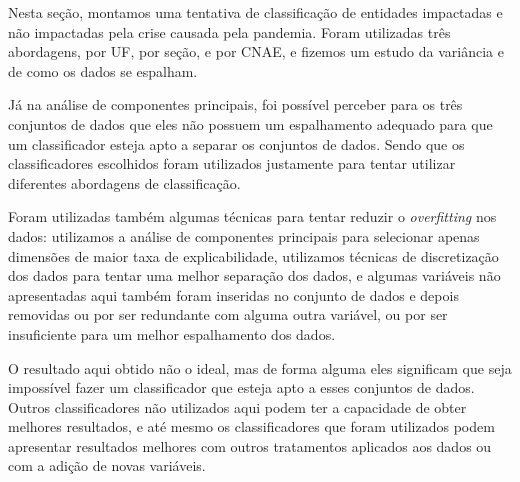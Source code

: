 Nesta seção, montamos uma tentativa de classificação de entidades impactadas e não impactadas pela crise causada pela pandemia. Foram utilizadas três abordagens, por UF, por seção, e por CNAE, e fizemos um estudo da variância e de como os dados se espalham.

Já na análise de componentes principais, foi possível perceber para os três conjuntos de dados que eles não possuem um espalhamento adequado para que um classificador esteja apto a separar os conjuntos de dados. Sendo que os classificadores escolhidos foram utilizados justamente para tentar utilizar diferentes abordagens de classificação.

Foram utilizadas também algumas técnicas para tentar reduzir o \textit{overfitting} nos dados: utilizamos a análise de componentes principais para selecionar apenas dimensões de maior taxa de explicabilidade, utilizamos técnicas de discretização dos dados para tentar uma melhor separação dos dados, e algumas variáveis não apresentadas aqui também foram inseridas no conjunto de dados e depois removidas ou por ser redundante com alguma outra variável, ou por ser insuficiente para um melhor espalhamento dos dados.

O resultado aqui obtido não o ideal, mas de forma alguma eles significam que seja impossível fazer um classificador que esteja apto a esses conjuntos de dados. Outros classificadores não utilizados aqui podem ter a capacidade de obter melhores resultados, e até mesmo os classificadores que foram utilizados podem apresentar resultados melhores com outros tratamentos aplicados aos dados ou com a adição de novas variáveis.
